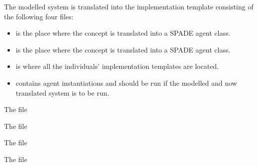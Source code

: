 The modelled system is translated into the implementation template consisting of the following four files:
\begin{itemize}
    \item
     is the place where the  concept is translated into a \ac{SPADE} agent class.

    \item
     is the place where the  concept is translated into a \ac{SPADE} agent class.

    \item
     is where all the  individuals' implementation templates are located.

    \item
     contains agent instantiations and should be run if the modelled and now translated system is to be run.
\end{itemize}

\begin{listing}
    \caption{The  file}
    \label{lst: example mago-ag factory agent}
\end{listing}

\begin{listing}
    \caption{The  file}
    \label{lst: example mago-ag recipe agent}
\end{listing}

\begin{listing}
    \caption{The  file}
    \label{lst: example mago-ag behaviours}
\end{listing}

\begin{longlisting}
    \caption{The  file}
    \label{lst: example mago-ag workspace}
\end{longlisting}